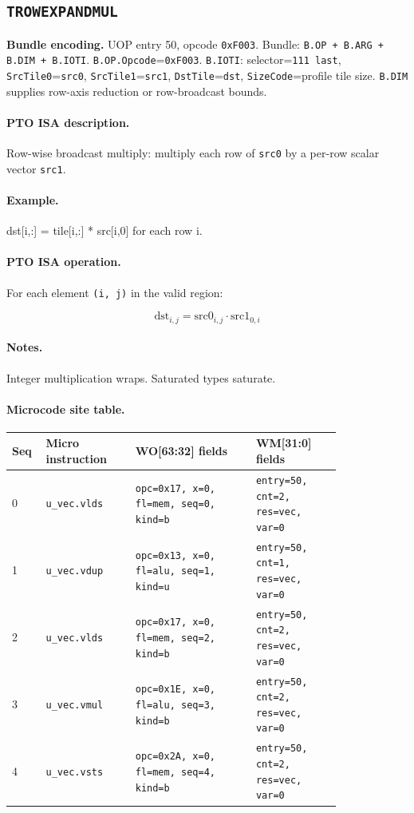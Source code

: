 \subsection{\texttt{TROWEXPANDMUL}}
\noindent\textbf{Bundle encoding.} UOP entry 50, opcode \texttt{0xF003}. Bundle: \texttt{B.OP + B.ARG + B.DIM + B.IOTI}. \texttt{B.OP.Opcode}=\texttt{0xF003}. \texttt{B.IOTI}: selector=\texttt{111 last}, \texttt{SrcTile0}=\texttt{src0}, \texttt{SrcTile1}=\texttt{src1}, \texttt{DstTile}=\texttt{dst}, \texttt{SizeCode}=profile tile size. \texttt{B.DIM} supplies row-axis reduction or row-broadcast bounds.\par\smallskip
{\small
\paragraph{PTO ISA description.}
Row-wise broadcast multiply: multiply each row of \texttt{src0} by a per-row scalar vector \texttt{src1}.
\paragraph{Example.}
dst[i,:] = tile[i,:] * src[i,0] for each row i.
\par\smallskip
\paragraph{PTO ISA operation.}
For each element \texttt{(i, j)} in the valid region:

\[
\mathrm{dst}_{i,j} = \mathrm{src0}_{i,j} \cdot \mathrm{src1}_{0,i}
\]
}\par\smallskip
\paragraph{Notes.}
Integer multiplication wraps. Saturated types saturate.
\paragraph{Microcode site table.}
{\scriptsize
\begin{longtable}{@{}R{0.055\linewidth}L{0.23\linewidth}L{0.31\linewidth}L{0.22\linewidth}@{}}
\toprule
Seq & Micro instruction & WO[63:32] fields & WM[31:0] fields \\
 & \texttt{u\_vec.vlds} & \texttt{opc=0x17, x=0, fl=mem, seq=0, kind=b} & \texttt{entry=50, cnt=2, res=vec, var=0} \\
1 & \texttt{u\_vec.vdup} & \texttt{opc=0x13, x=0, fl=alu, seq=1, kind=u} & \texttt{entry=50, cnt=1, res=vec, var=0} \\
2 & \texttt{u\_vec.vlds} & \texttt{opc=0x17, x=0, fl=mem, seq=2, kind=b} & \texttt{entry=50, cnt=2, res=vec, var=0} \\
3 & \texttt{u\_vec.vmul} & \texttt{opc=0x1E, x=0, fl=alu, seq=3, kind=b} & \texttt{entry=50, cnt=2, res=vec, var=0} \\
4 & \texttt{u\_vec.vsts} & \texttt{opc=0x2A, x=0, fl=mem, seq=4, kind=b} & \texttt{entry=50, cnt=2, res=vec, var=0} \\
\bottomrule
\end{longtable}
}

